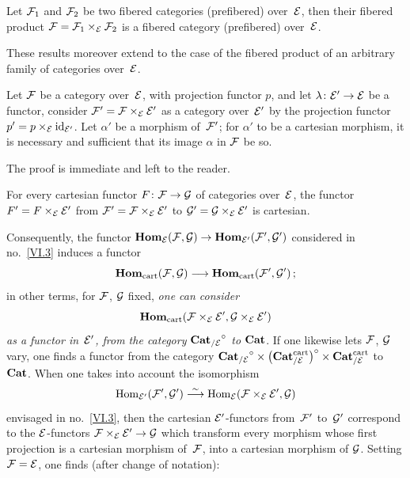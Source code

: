 \begin{corollary}
\label{VI.6.5}
Let $\cal{F}_1$ and $\cal{F}_2$ be two fibered categories
(\resp prefibered) over~$\cal{E}$, then their fibered
product $\cal{F}=\cal{F}_1 \times_{\cal{E}}\cal{F}_2$ is a
fibered category (\resp prefibered) over~$\cal{E}$.
\end{corollary}

These results moreover extend to the case of the fibered
product of an arbitrary family of categories over~$\cal{E}$.

\begin{proposition}
\label{VI.6.6}
Let $\cal{F}$ be a category over~$\cal{E}$, with
projection functor $p$, and let $\lambda \colon \cal{E}' \to \cal{E}$
be a functor, consider
$\cal{F}'=\cal{F}\times_{\cal{E}}\cal{E}'$ as a category over~$\cal{E}'$ by the projection functor $p'=p \times_{\cal{E}}
\id_{\cal{E}'}$. Let $\alpha'$ be a morphism of~$\cal{F}'$; for
$\alpha'$ to be a cartesian morphism, it is necessary and sufficient that
its image $\alpha$ in $\cal{F}$ be so.
\end{proposition}

The proof is immediate and left to the reader.

\begin{corollary}
\label{VI.6.7}
For every cartesian functor $F\colon \cal{F} \to \cal{G}$ of
categories over~$\cal{E}$, the functor
$F'=F\times_{\cal{E}}\cal{E}'$ from
$\cal{F}'=\cal{F}\times_{\cal{E}}\cal{E}'$ to
$\cal{G}'=\cal{G}\times_{\cal{E}}\cal{E}'$ is cartesian.
\end{corollary}

Consequently, the functor $\SheafHom_{\cal{E}}(\cal{F},\cal{G}) \to
\SheafHom_{\cal{E}'}(\cal{F}',\cal{G}')$ considered in
no.~\ref{VI.3} induces a functor
$$
\SheafHom_\cart(\cal{F},\cal{G}) \to
\SheafHom_{\cart}(\cal{F}',\cal{G}')\,;
$$
in other terms, for $\cal{F}$, $\cal{G}$ fixed, \emph{one can
consider}
$$
\SheafHom_\cart(\cal{F} \times_{\cal{E}} \cal{E}',
\cal{G}\times_{\cal{E}} \cal{E}')
$$
\emph{as
a functor in~$\cal{E}'$, from the category
${\Cat_{/\cal{E}}}^\circ$ to $\Cat$}. If one likewise lets
$\cal{F}$, $\cal{G}$ vary, one finds
a functor from the category ${\Cat_{/\cal{E}}}^\circ \times \big(
\Cat^\cart_{/\cal{E}} \big)^\circ \times \Cat^\cart_{/\cal{E}}$
to~$\Cat$. When one takes into account the isomorphism
$$
\Hom_{\cal{E}'}(\cal{F}',\cal{G}') \isomto
\Hom_\cal{E}(\cal{F}\times_\cal{E}\cal{E}',\cal{G})
$$
envisaged in no.~\ref{VI.3}, then the cartesian $\cal{E}'$-functors
from~$\cal{F}'$ to~$\cal{G}'$ correspond to the $\cal{E}$-functors
$\cal{F} \times_\cal{E} \cal{E}' \to \cal{G}$ which transform every
morphism whose first projection is a cartesian
morphism of~$\cal{F}$, into a cartesian morphism of
$\cal{G}$. Setting $\cal{F}=\cal{E}$, one finds (after change
of notation):

